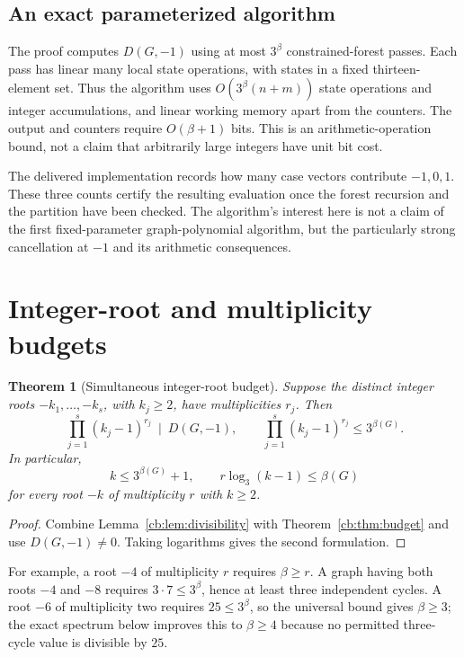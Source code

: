 \documentclass[11pt]{article}
\numberwithin{equation}{section}
\newtheorem{theorem}{Theorem}[section]
\theoremstyle{definition}
\begin{document}
\subsection{An exact parameterized algorithm}
The proof computes $D(G,-1)$ using at most $3^\beta$ constrained-forest
passes. Each pass has linear many local state operations, with states in a
fixed thirteen-element set. Thus the algorithm uses
$O(3^\beta(n+m))$ state operations and integer accumulations, and linear
working memory apart from the counters. The output and counters require
$O(\beta+1)$ bits. This is an arithmetic-operation bound, not a claim that
arbitrarily large integers have unit bit cost.

The delivered implementation records how many case vectors contribute
$-1,0,1$. These three counts certify the resulting evaluation once the
forest recursion and the partition have been checked. The algorithm's
interest here is not a claim of the first fixed-parameter graph-polynomial
algorithm, but the particularly strong cancellation at $-1$ and its
arithmetic consequences.

\section{Integer-root and multiplicity budgets}

\begin{theorem}[Simultaneous integer-root budget]\label{cb:thm:roots}
Suppose the distinct integer roots $-k_1,\ldots,-k_s$, with $k_j\ge2$,
have multiplicities $r_j$. Then
\begin{equation}\label{cb:eq:rootbudget}
 \prod_{j=1}^s(k_j-1)^{r_j}\ \mid\ D(G,-1),\qquad
 \prod_{j=1}^s(k_j-1)^{r_j}\le3^{\beta(G)}.
\end{equation}
In particular,
\begin{equation}\label{cb:eq:rootcor}
 k\le3^{\beta(G)}+1,
 \qquad r\log_3(k-1)\le\beta(G)
\end{equation}
for every root $-k$ of multiplicity $r$ with $k\ge2$.
\end{theorem}
\begin{proof}
Combine Lemma~\ref{cb:lem:divisibility} with Theorem~\ref{cb:thm:budget} and use
$D(G,-1)\ne0$. Taking logarithms gives the second formulation.
\end{proof}

For example, a root $-4$ of multiplicity $r$ requires $\beta\ge r$.
A graph having both roots $-4$ and $-8$ requires
$3\cdot7\le3^\beta$, hence at least three independent cycles.
A root $-6$ of multiplicity two requires $25\le3^\beta$, so the universal
bound gives $\beta\ge3$; the exact spectrum below improves this to
$\beta\ge4$ because no permitted three-cycle value is divisible by $25$.
\end{document}
